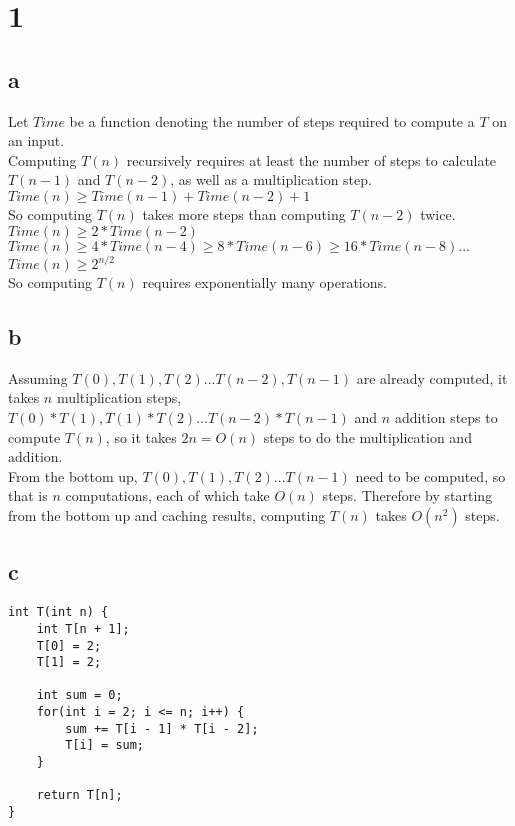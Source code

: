 \documentclass[letterpaper,notitlepage,twoside]{article}
\begin{document}
\section*{1}
\subsection*{a}
Let $Time$ be a function denoting the number of steps required to compute a $T$ on an input. \\
Computing $T(n)$ recursively requires at least the number of steps to calculate $T(n - 1)$ and $T(n - 2)$, as well as a multiplication step. \\
$Time(n) \geq Time(n - 1) + Time(n - 2) + 1$ \\
So computing $T(n)$ takes more steps than computing $T(n - 2)$ twice. \\
$Time(n) \geq 2 * Time(n - 2)$ \\
$Time(n) \geq 4 * Time(n - 4) \geq 8 * Time(n - 6) \geq 16 * Time(n - 8) ...$ \\
$Time(n) \geq 2^{n/2}$ \\
So computing $T(n)$ requires exponentially many operations.

\subsection*{b}
Assuming $T(0), T(1), T(2)...T(n -2), T(n - 1)$ are already computed, it takes $n$ multiplication steps, $T(0) * T(1), T(1) * T(2)...T(n - 2) * T(n - 1)$ and $n$ addition steps to compute $T(n)$, so it takes $2n = O(n)$ steps to do the multiplication and addition. \\
From the bottom up, $T(0), T(1), T(2)...T(n - 1)$ need to be computed, so that is $n$ computations, each of which take $O(n)$ steps. Therefore by starting from the bottom up and caching results, computing $T(n)$ takes $O(n^2)$ steps.

\subsection*{c}
\begin{verbatim}
int T(int n) {
    int T[n + 1];
    T[0] = 2;
    T[1] = 2;
    
    int sum = 0;
    for(int i = 2; i <= n; i++) {
        sum += T[i - 1] * T[i - 2];
        T[i] = sum;
    }
    
    return T[n];
}
\end{verbatim}
\end{document}

